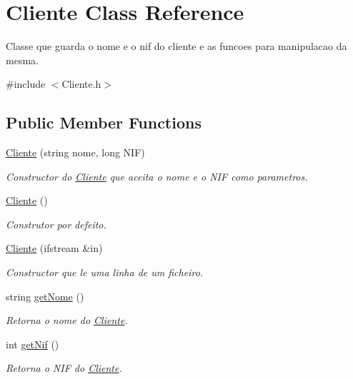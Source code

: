 \hypertarget{class_cliente}{}\section{Cliente Class Reference}
\label{class_cliente}


Classe que guarda o nome e o nif do cliente e as funcoes para manipulacao da mesma.  




{\ttfamily \#include $<$Cliente.\+h$>$}

\subsection*{Public Member Functions}
\begin{DoxyCompactItemize}
\item 
\hyperlink{class_cliente_a14240898329d14688bb7e2e2709db710}{Cliente} (string nome, long N\+IF)
\begin{DoxyCompactList}\small\item\em Constructor do \hyperlink{class_cliente}{Cliente} que aceita o nome e o N\+IF como parametros. \end{DoxyCompactList}\item 
\hyperlink{class_cliente_ab6a372f412692c12c4be4427b00a3f6e}{Cliente} ()
\begin{DoxyCompactList}\small\item\em Construtor por defeito. \end{DoxyCompactList}\item 
\hyperlink{class_cliente_a6ea9b20d8340c4f6df9bb6a79e828ccc}{Cliente} (ifstream \&in)
\begin{DoxyCompactList}\small\item\em Constructor que le uma linha de um ficheiro. \end{DoxyCompactList}\item 
string \hyperlink{class_cliente_ac9662059b96002d423e33cb6827b37f1}{get\+Nome} ()
\begin{DoxyCompactList}\small\item\em Retorna o nome do \hyperlink{class_cliente}{Cliente}. \end{DoxyCompactList}\item 
int \hyperlink{class_cliente_a243d3f408b70d3ab6466dfa32b9f40a6}{get\+Nif} ()
\begin{DoxyCompactList}\small\item\em Retorna o N\+IF do \hyperlink{class_cliente}{Cliente}. \end{DoxyCompactList}\item 

\end{DoxyCompactItemize}

